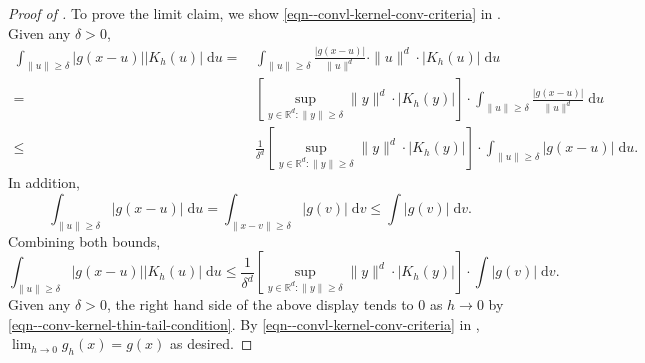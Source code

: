 \begin{proof}[Proof of ]
To prove the limit claim, we show \eqref{eqn--convl-kernel-conv-criteria} in
.
Given any \(\delta > 0\),
\begin{align*}
  \int_{\|u\| \geq \delta} |g (x - u)| \left| K_{h} (u) \right| \; \mathrm{d} u
  =
  & \, \int_{\|u\| \geq \delta} \frac{|g (x - u)|}{\|u\|^{d}} \cdot \|u\|^{d}
  \cdot \left| K_{h} (u) \right| \; \mathrm{d} u \\
  =
  & \, \left[ \sup_{y \in \mathbb{R}^{d} : \|y\| \geq \delta} \|y\|^{d} \cdot
  \left| K_{h} (y) \right| \right] \cdot \int_{\|u\| \geq \delta} \frac{|g (x -
  u)|}{\|u\|^{d}} \; \mathrm{d} u \\
  \leq
  & \, \frac{1}{\delta^{d}} \left[ \sup_{y \in \mathbb{R}^{d} : \|y\| \geq
  \delta} \|y\|^{d} \cdot \left| K_{h} (y) \right| \right] \cdot \int_{\|u\|
  \geq \delta} |g (x - u)| \; \mathrm{d} u.
\end{align*}
In addition,
\begin{equation*}
  \int_{\|u\| \geq \delta} |g (x - u)| \; \mathrm{d} u = \int_{\|x - v\| \geq
  \delta} |g (v)| \; \mathrm{d} v \leq \int |g (v)| \; \mathrm{d} v.
\end{equation*}
Combining both bounds,
\begin{equation*}
  \int_{\|u\| \geq \delta} |g (x - u)| \left| K_{h} (u) \right| \; \mathrm{d} u
  \leq \frac{1}{\delta^{d}} \left[ \sup_{y \in \mathbb{R}^{d} : \|y\| \geq
  \delta} \|y\|^{d} \cdot \left| K_{h} (y) \right| \right] \cdot \int |g (v)| \;
  \mathrm{d} v.
\end{equation*}
Given any \(\delta > 0\), the right hand side of the above display tends to 0 as
\(h \to 0\) by \eqref{eqn--conv-kernel-thin-tail-condition}.
By \eqref{eqn--convl-kernel-conv-criteria} in
, \(\lim_{h \to 0} g_{h} (x) = g (x)\) as
desired.
\end{proof}


